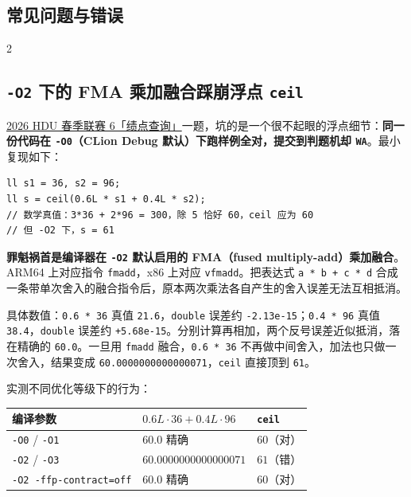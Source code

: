 	\begin{center}
		\section{常见问题与错误}
	\end{center}

	\begin{multicols*}{2}

		\subsection{\texttt{-O2} 下的 FMA 乘加融合踩崩浮点 \texttt{ceil}}

		\href{https://acm.hdu.edu.cn/contest/problem?cid=1202&pid=1003}{2026 HDU 春季联赛 6「绩点查询」}一题，坑的是一个很不起眼的浮点细节：\textbf{同一份代码在 \texttt{-O0}（CLion Debug 默认）下跑样例全对，提交到判题机却 \texttt{WA}}。最小复现如下：

		\begin{verbatim}
ll s1 = 36, s2 = 96;
ll s = ceil(0.6L * s1 + 0.4L * s2);
// 数学真值：3*36 + 2*96 = 300，除 5 恰好 60，ceil 应为 60
// 但 -O2 下，s = 61
		\end{verbatim}

		\textbf{罪魁祸首是编译器在 \texttt{-O2} 默认启用的 FMA（fused multiply-add）乘加融合}。ARM64 上对应指令 \texttt{fmadd}，x86 上对应 \texttt{vfmadd}。把表达式 \texttt{a * b + c * d} 合成一条带单次舍入的融合指令后，原本两次乘法各自产生的舍入误差无法互相抵消。

		具体数值：\texttt{0.6 * 36} 真值 \texttt{21.6}，\texttt{double} 误差约 \texttt{-2.13e-15}；\texttt{0.4 * 96} 真值 \texttt{38.4}，\texttt{double} 误差约 \texttt{+5.68e-15}。分别计算再相加，两个反号误差近似抵消，落在精确的 \texttt{60.0}。一旦用 \texttt{fmadd} 融合，\texttt{0.6 * 36} 不再做中间舍入，加法也只做一次舍入，结果变成 \texttt{60.0000000000000071}，\texttt{ceil} 直接顶到 \texttt{61}。

		实测不同优化等级下的行为：

		\begin{center}
			\small
			\begin{tabular}{l|l|l}
				\hline
				编译参数                      & $0.6L \cdot 36 + 0.4L \cdot 96$ & \texttt{ceil} \\
				\hline
				\texttt{-O0} / \texttt{-O1}    & $60.0$ 精确                       & $60$（对）       \\
				\texttt{-O2} / \texttt{-O3}    & $60.0000000000000071$           & $61$（错）       \\
				\texttt{-O2 -ffp-contract=off} & $60.0$ 精确                       & $60$（对）       \\
				\hline
			\end{tabular}
		\end{center}


\end{multicols*}
